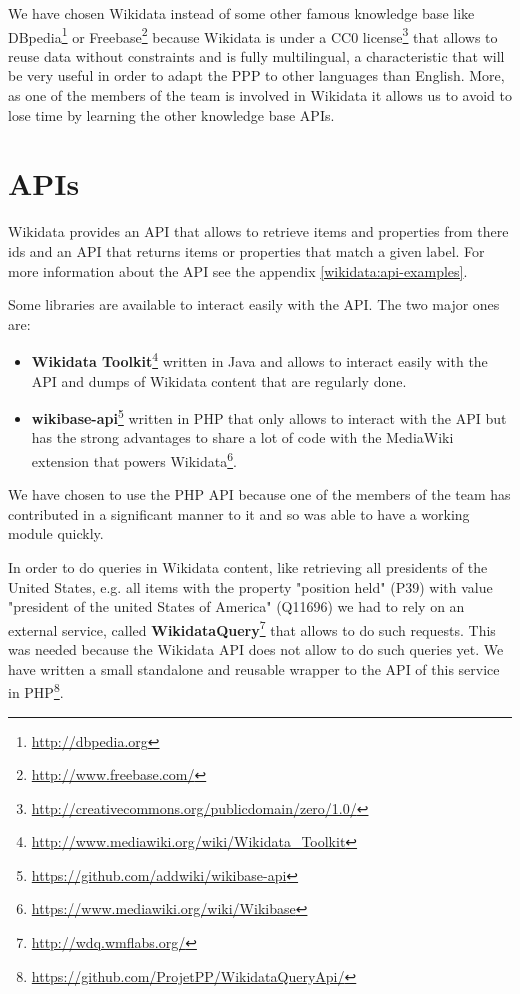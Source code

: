 We have chosen Wikidata instead of some other famous knowledge base like DBpedia\footnote{\url{http://dbpedia.org}} or Freebase\footnote{\url{http://www.freebase.com/}} because Wikidata is under a CC0 license\footnote{\url{http://creativecommons.org/publicdomain/zero/1.0/}} that allows to reuse data without constraints and is fully multilingual, a characteristic that will be very useful in order to adapt the PPP to other languages than English. More, as one of the members of the team is involved in Wikidata it allows us to avoid to lose time by learning the other knowledge base APIs.

\section{APIs}
Wikidata provides an API that allows to retrieve items and properties from there ids and an API that returns items or properties that match a given label. For more information about the API see the appendix \ref{wikidata:api-examples}.

Some libraries are available to interact easily with the API. The two major ones are:
\begin{itemize}
    \item \textbf{Wikidata Toolkit}\footnote{\url{http://www.mediawiki.org/wiki/Wikidata_Toolkit}} written in Java and allows to interact easily with the API and dumps of Wikidata content that are regularly done.
    \item \textbf{wikibase-api}\footnote{\url{https://github.com/addwiki/wikibase-api}} written in PHP that only allows to interact with the API but has the strong advantages to share a lot of code with the MediaWiki extension that powers Wikidata\footnote{\url{https://www.mediawiki.org/wiki/Wikibase}}.
\end{itemize}

We have chosen to use the PHP API because one of the members of the team has contributed in a significant manner to it and so was able to have a working module quickly.

In order to do queries in Wikidata content, like retrieving all presidents of the United States, e.g. all items with the property "position held" (P39) with value "president of the united States of America" (Q11696) we had to rely on an external service, called \textbf{WikidataQuery}\footnote{\url{http://wdq.wmflabs.org/}} that allows to do such requests. This was needed because the Wikidata API does not allow to do such queries yet. We have written a small standalone and reusable wrapper to the API of this service in PHP\footnote{\url{https://github.com/ProjetPP/WikidataQueryApi/}}.


